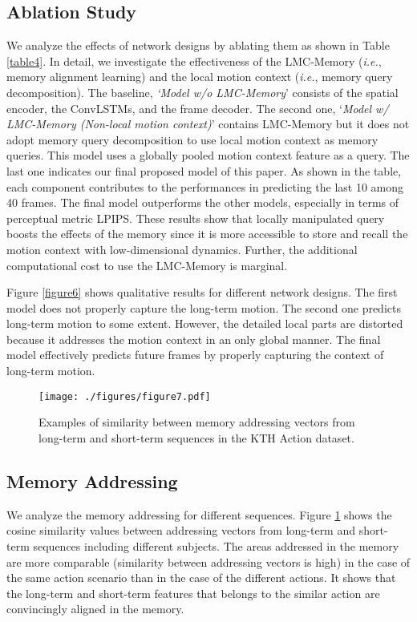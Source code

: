 \documentclass[final]{cvpr}
\begin{document}
\subsection{Ablation Study}
We analyze the effects of network designs by ablating them as shown in Table \ref{table4}. In detail, we investigate the effectiveness of the LMC-Memory (\textit{i.e.}, memory alignment learning) and the local motion context (\textit{i.e.}, memory query decomposition). The baseline, \textit{`Model w/o LMC-Memory}' consists of the spatial encoder, the ConvLSTMs, and the frame decoder. The second one, `\textit{Model w/ LMC-Memory (Non-local motion context)}' contains LMC-Memory but it does not adopt memory query decomposition to use local motion context as memory queries. This model uses a globally pooled motion context feature as a query. The last one indicates our final proposed model of this paper. As shown in the table, each component contributes to the performances in predicting the last 10 among 40 frames. The final model outperforms the other models, especially in terms of perceptual metric LPIPS. These results show that locally manipulated query boosts the effects of the memory since it is more accessible to store and recall the motion context with low-dimensional dynamics. Further, the additional computational cost to use the LMC-Memory is marginal. 

Figure \ref{figure6} shows qualitative results for different network designs. The first model does not properly capture the long-term motion. The second one predicts long-term motion to some extent. However, the detailed local parts are distorted because it addresses the motion context in an only global manner. The final model effectively predicts future frames by properly capturing the context of long-term motion.

\begin{figure}[t]
	\begin{minipage}[b]{1.0\linewidth}
		\centering
		\centerline{\texttt{[image: ./figures/figure7.pdf]}}
	\end{minipage}
		\vspace{-0.6cm}
	\caption{Examples of similarity between memory addressing vectors from long-term and short-term sequences in the KTH Action dataset.}
	\label{figure7}
		\vspace{-0.30cm}
\end{figure}


\subsection{Memory Addressing}
We analyze the memory addressing for different sequences. Figure \ref{figure7} shows the cosine similarity values between addressing vectors from long-term and short-term sequences including different subjects. The areas addressed in the memory are more comparable (similarity between addressing vectors is high) in the case of the same action scenario than in the case of the different actions. It shows that the long-term and short-term features that belongs to the similar action are convincingly aligned in the memory.
\end{document}
